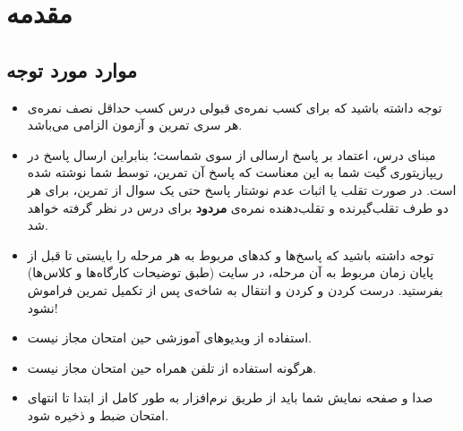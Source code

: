 \section{مقدمه}
    
    \subsection{موارد مورد توجه}
    
    \begin{itemize}
        \item
        توجه داشته باشید که برای کسب نمره‌ی قبولی درس کسب حداقل نصف نمره‌ی هر سری تمرین و آزمون الزامی می‌باشد.
        \item
        مبنای درس، اعتماد بر پاسخ ارسالی از سوی شماست؛ بنابراین ارسال پاسخ در ریپازیتوری گیت شما به این معناست که پاسخ آن تمرین، توسط شما نوشته شده است. در صورت تقلب یا اثبات عدم نوشتار پاسخ حتی یک سوال از تمرین، برای هر دو طرف تقلب‌گیرنده و تقلب‌دهنده نمره‌ی 
        \textbf{مردود}
         برای درس در نظر گرفته خواهد شد.
        \item
        توجه داشته باشید که پاسخ‌ها و کدهای مربوط به هر مرحله را بایستی تا قبل از پایان زمان مربوط به آن مرحله، در سایت
        \href{https://dev.azure.com}{}
        (طبق توضیحات کارگاه‌ها و کلاس‌ها) بفرستید.
        درست کردن  
        و 
        کردن 
        و انتقال به شاخه‌ی 
        پس از تکمیل تمرین فراموش نشود!
        \item 
	      استفاده از ویدیوهای آموزشی حین امتحان مجاز نیست.
	    \item
	      هرگونه استفاده از تلفن همراه حین امتحان مجاز نیست.
        \item
	      صدا و صفحه نمایش شما باید از طریق نرم‌افزار
	      به طور کامل از ابتدا تا انتهای امتحان ضبط و ذخیره شود.
        
    \end{itemize}